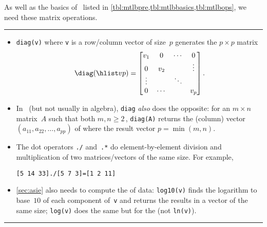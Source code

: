 \begin{table}
\caption{As well as the basics of \script\ listed in 
\cref{tbl:mtlbpre,tbl:mtlbbasics,tbl:mtlbops},  we need these matrix operations.} \label{tbl:mtlbmops}
\hrule
\begin{minipage}{\linewidth}
\begin{itemize}
\item {}\verb|diag(v)| where \verb|v| is a row/column vector of size~\(p\) generates the \(p\times p\) matrix 
\begin{equation*}
\diag(\hlist vp)=\begin{bmatrix} v_1&0&\cdots&0\\
0&v_2&&\vdots\\ \vdots&&\ddots\\ 0&\cdots&&v_p \end{bmatrix}.
\end{equation*}

\item In \script\ (but not usually in algebra), \verb|diag| \emph{also} does the opposite: for an \(m\times n\) matrix~\(A\) such that both \(m,n\geq2\)\,,  \verb|diag(A)| returns the (column) vector \((a_{11},a_{22},\ldots,a_{pp})\) of  where the result vector  \(p=\min(m,n)\).

\item The dot operators \verb|./| and~\verb|.*| do element-by-element division and multiplication of two matrices\slash vectors of the same size.  For example, 
\begin{verbatim}
[5 14 33]./[5 7 3]=[1 2 11]
\end{verbatim}


\item \cref{sec:asie} also needs to compute the  of data: \verb|log10(v)| finds the logarithm to base~\(10\) of each component of~\verb|v| and returns the results in a vector of the same size; \verb|log(v)| does the same but for the  (not \verb|ln(v)|).

\end{itemize}
\end{minipage}
\hrule
\end{table}





